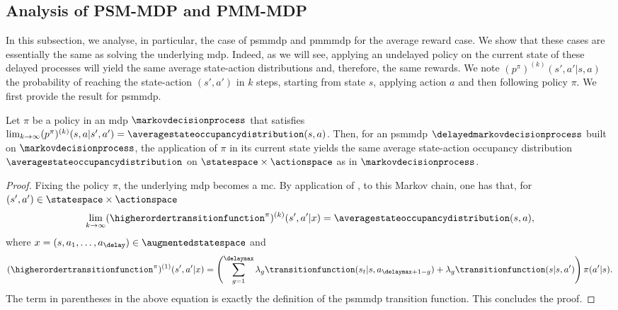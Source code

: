 \subsection{Analysis of PSM-MDP and PMM-MDP}
\label{subsec:analysis_psmmdp_pmmmdp}

In this subsection, we analyse, in particular, the case of \gls{psmmdp} and \gls{pmmmdp} for the average reward case.
We show that these cases are essentially the same as solving the underlying \gls{mdp}.
Indeed, as we will see, applying an undelayed policy on the current state of these delayed processes will yield the same average state-action distributions and, therefore, the same rewards.
We note $(p^\pi)^{(k)}(s',a'\vert s,a)$ the probability of reaching the state-action $(s',a')$ in $k$ steps, starting from state $s$, applying action $a$ and then following policy $\pi$.
We first provide the result for \gls{psmmdp}.

\begin{lemma}
\label{lem:same_distrib_psmmdp}
    Let $\pi$ be a policy in an \gls{mdp} $\markovdecisionprocess$ that satisfies $\textstyle\lim_{k\rightarrow\infty}(p^\pi)^{(k)}(s,a\vert s',a')= \averagestateoccupancydistribution(s,a)$.
    Then, for an \gls{psmmdp} $\delayedmarkovdecisionprocess$ built on $\markovdecisionprocess$, the application of $\pi$ in its current state yields the same average state-action occupancy distribution $\averagestateoccupancydistribution$ on $\statespace\times\actionspace$ as in $\markovdecisionprocess$.
\end{lemma}
\begin{proof}
    Fixing the policy $\pi$, the underlying \gls{mdp} becomes a \gls{mc}. 
    By application of \cite[Theorem~2.1]{adke1988limit}, to this Markov chain, one has that, for $(s',a')\in\statespace\times\actionspace$
    \begin{align*}
        \lim_{k\rightarrow\infty}(\higherordertransitionfunction^\pi)^{(k)}(s',a' \vert x) = \averagestateoccupancydistribution(s,a),
    \end{align*}
    where $x=(s,a_1,\dots,a_\delay)\in\augmentedstatespace$ and
    \begin{align*}
        (\higherordertransitionfunction^\pi)^{(1)}(s',a' \vert x)= \left(\sum_{g=1}^{\delaymax} \lambda_g \transitionfunction(s_t\vert s,a_{\delaymax+1-g}) + \lambda_g \transitionfunction(s\vert s,a')\right)\pi(a'\vert s).
    \end{align*} 
    The term in parentheses in the above equation is exactly the definition of the \gls{psmmdp} transition function.
    This concludes the proof.
\end{proof}

